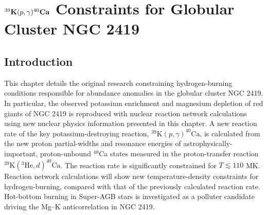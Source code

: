 \chapter{\texorpdfstring{$^{39}\mathrm{\textbf{K}}(\MakeLowercase{p},\gamma)^{40}\mathrm{\textbf{C\MakeLowercase{a}}}$}{39K(p,g)40Ca} Constraints for Globular Cluster NGC 2419}
\label{ch:GC}

\section{Introduction}


This chapter details the original research constraining hydrogen-burning conditions responsible for abundance anomalies in the globular cluster NGC 2419. In particular, the observed potassium enrichment and magnesium depletion of red giants of NGC 2419 is reproduced with nuclear reaction network calculations using new nuclear physics information presented in this chapter. A new reaction rate of the key potassium-destroying reaction, $^{39}\mathrm{K}(p,\gamma)^{40}\mathrm{Ca}$, is calculated from the new proton partial-widths and resonance energies of astrophysically-important, proton-unbound $^{40}$Ca states measured in the proton-transfer reaction $^{39}\mathrm{K}(^{3}\mathrm{He},d)^{40}\mathrm{Ca}$. The reaction rate is significantly constrained for $T \lesssim 110$ MK. Reaction network calculations will show new temperature-density constraints for hydrogen-burning, compared with that of the previously calculated reaction rate. Hot-bottom burning in Super-AGB stars is investigated as a polluter candidate driving the Mg--K anticorrelation in NGC 2419.

